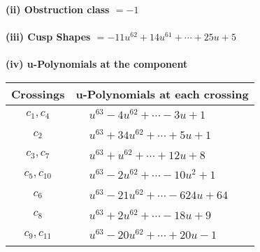 \documentclass[1p]{elsarticle_modified}
\theoremstyle{definition}
\begin{document}
\flushleft \textbf{(ii) Obstruction class $= -1$}\\~\\
\flushleft \textbf{(iii) Cusp Shapes $= -11 u^{62}+14 u^{61}+\cdots+25 u+5$}\\~\\
\newpage\renewcommand{\arraystretch}{1}
\flushleft \textbf{(iv) u-Polynomials at the component}\newline \\
\begin{tabular}{m{50pt}|m{274pt}}
Crossings & \hspace{64pt}u-Polynomials at each crossing \\
\hline $$\begin{aligned}c_{1},c_{4}\end{aligned}$$&$\begin{aligned}
&u^{63}-4 u^{62}+\cdots-3 u+1
\end{aligned}$\\
\hline $$\begin{aligned}c_{2}\end{aligned}$$&$\begin{aligned}
&u^{63}+34 u^{62}+\cdots+5 u+1
\end{aligned}$\\
\hline $$\begin{aligned}c_{3},c_{7}\end{aligned}$$&$\begin{aligned}
&u^{63}+u^{62}+\cdots+12 u+8
\end{aligned}$\\
\hline $$\begin{aligned}c_{5},c_{10}\end{aligned}$$&$\begin{aligned}
&u^{63}-2 u^{62}+\cdots-10 u^2+1
\end{aligned}$\\
\hline $$\begin{aligned}c_{6}\end{aligned}$$&$\begin{aligned}
&u^{63}-21 u^{62}+\cdots-624 u+64
\end{aligned}$\\
\hline $$\begin{aligned}c_{8}\end{aligned}$$&$\begin{aligned}
&u^{63}+2 u^{62}+\cdots-18 u+9
\end{aligned}$\\
\hline $$\begin{aligned}c_{9},c_{11}\end{aligned}$$&$\begin{aligned}
&u^{63}-20 u^{62}+\cdots+20 u-1
\end{aligned}$\\
\hline
\end{tabular}\\~\\
\end{document}
